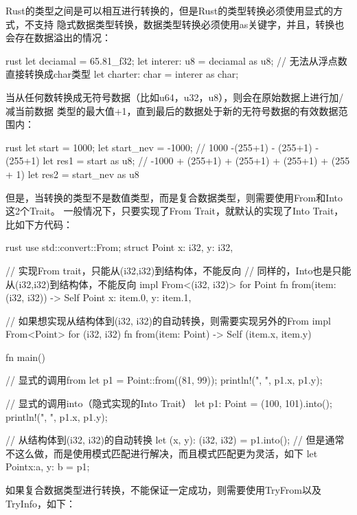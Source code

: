 Rust的类型之间是可以相互进行转换的，但是Rust的类型转换必须使用显式的方式，不支持
隐式数据类型转换，数据类型转换必须使用as关键字，并且，转换也会存在数据溢出的情况：
\begin{code-block}{rust}
let deciamal = 65.81_f32;
let interer: u8 = deciamal as u8;
// 无法从浮点数直接转换成char类型
let charter: char = interer as char;
\end{code-block}
当从任何数转换成无符号数据（比如u64，u32，u8），则会在原始数据上进行加/减当前数据
类型的最大值+1，直到最后的数据处于新的无符号数据的有效数据范围内：
\begin{code-block}{rust}
let start = 1000;
let start_nev = -1000;
// 1000 -(255+1) - (255+1) - (255+1)
let res1 = start as u8;
// -1000 + (255+1) + (255+1) + (255+1) + (255 + 1)
let res2 = start_nev as u8
\end{code-block}

但是，当转换的类型不是数值类型，而是复合数据类型，则需要使用From和Into这2个Trait。
一般情况下，只要实现了From Trait，就默认的实现了Into Trait，比如下方代码：
\begin{code-block}{rust}
use std::convert::From;
struct Point {
    x: i32,
    y: i32,
}

// 实现From trait，只能从(i32,i32)到结构体，不能反向
// 同样的，Into也是只能从(i32,i32)到结构体，不能反向
impl From<(i32, i32)> for Point {
    fn from(item: (i32, i32)) -> Self {
        Point {
            x: item.0,
            y: item.1,
        }
    }
}

// 如果想实现从结构体到(i32, i32)的自动转换，则需要实现另外的From
impl From<Point> for (i32, i32) {
    fn from(item: Point) -> Self {
        (item.x, item.y)
    }
}

fn main() {
    // 显式的调用from
    let p1 = Point::from((81, 99));
    println!("{}, {}", p1.x, p1.y);

    // 显式的调用into（隐式实现的Into Trait）
    let p1: Point = (100, 101).into();
    println!("{}, {}", p1.x, p1.y);

    // 从结构体到(i32, i32)的自动转换
    let (x, y): (i32, i32) = p1.into();
    // 但是通常不这么做，而是使用模式匹配进行解决，而且模式匹配更为灵活，如下
    let Point{x:a, y: b} = p1;
}
\end{code-block}

如果复合数据类型进行转换，不能保证一定成功，则需要使用TryFrom以及TryInfo，如下：

